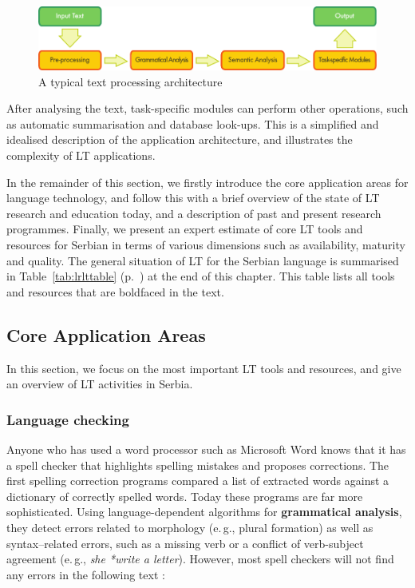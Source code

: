 \begin{multicols}{2}
\begin{figure}[tb]
  \center
  \includegraphics[width=\textwidth]{../_media/english/text_processing_app_architecture}
  \caption{A typical text processing architecture}
  \label{fig:textprocessingarch_en}
\end{figure}

After analysing the text, task-specific modules can perform other operations, such as automatic summarisation and database look-ups. This is a simplified and idealised description of the application architecture, and illustrates the complexity of LT applications. 

In the remainder of this section, we firstly introduce the core application areas for language technology, and follow this with a brief overview of the state of LT research and education today, and a description of past and present research programmes. Finally, we present an expert estimate of core LT tools and resources for Serbian in terms of various dimensions such as availability, maturity and quality. The general situation of LT for the Serbian language is summarised in
Table~\ref{tab:lrlttable} (p.~\pageref{tab:lrlttable}) at the end of this chapter. This table lists all tools and
resources that are boldfaced in the text. 
 
 

 \subsection {Core Application Areas}
   
In this section, we focus on the most important LT tools and resources, and give an overview of LT activities in Serbia.   

 \subsubsection {Language checking}
   
 Anyone who has used a word processor such as Microsoft Word knows that it has a spell checker that highlights spelling mistakes and proposes corrections. The first spelling correction programs compared a list of extracted words against a dictionary of correctly spelled words. Today these programs are far more sophisticated. Using language-dependent algorithms for \textbf{grammatical analysis}, they detect errors related to morphology (e.\,g., plural formation) as well as syntax–related errors, such as a missing verb or a conflict of verb-subject agreement (e.\,g., \textit{she *write a letter}). However, most spell checkers will not find any errors in the following text \cite{ZAR}:


\end{multicols}
